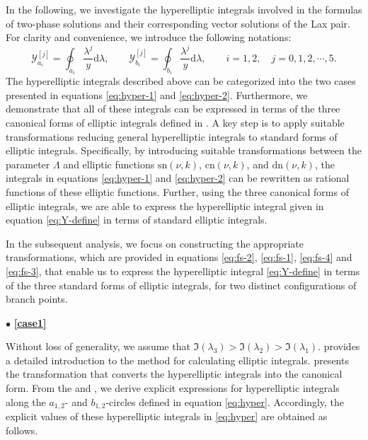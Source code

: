 \documentclass[11pt,reqno]{amsart}
\newcommand{\sn}{\mathrm{sn}}
\newcommand{\cn}{\mathrm{cn}}
\newcommand{\dn}{\mathrm{dn}}
\newcommand{\dd}{\mathrm{d}}
\numberwithin{equation}{section}
\begin{document}
In the following, we investigate the hyperelliptic integrals involved in the formulas of two-phase solutions and their corresponding vector solutions of the Lax pair.
For clarity and convenience, we introduce the following notations:
\begin{equation}\label{eq:Y-define}
	\mathcal{Y}_{a_i}^{[j]}=\oint_{a_i}\frac{\lambda^{j}}{y}\dd \lambda, \qquad \mathcal{Y}_{b_i}^{[j]}=\oint_{b_i}\frac{\lambda^{j}}{y}\dd \lambda, \qquad i=1,2, \quad j=0,1,2,\cdots,5. 
\end{equation}
The hyperelliptic integrals described above can be categorized into the two cases presented in equations \eqref{eq:hyper-1} and \eqref{eq:hyper-2}. 
Furthermore, we demonstrate that all of these integrals can be expressed in terms of the three canonical forms of elliptic integrals defined in . 
A key step is to apply suitable transformations reducing general hyperelliptic integrals to standard forms of elliptic integrals. 
Specifically, by introducing suitable transformations between the parameter $\Lambda$ and elliptic functions 
$\sn(\nu,k)$, $\cn(\nu,k)$, and $\dn(\nu,k)$, the integrals in equations \eqref{eq:hyper-1} and \eqref{eq:hyper-2} can be rewritten as rational functions of these elliptic functions.
Further, using the three canonical forms of elliptic integrals, we are able to express the hyperelliptic integral given in equation \eqref{eq:Y-define} in terms of standard elliptic integrals.

In the subsequent analysis, we focus on constructing the appropriate transformations, which are provided in equations \eqref{eq:fs-2}, \eqref{eq:fs-1}, \eqref{eq:fs-4} and \eqref{eq:fs-3}, that enable us to express the hyperelliptic integral \eqref{eq:Y-define} in terms of the three standard forms of elliptic integrals, for two distinct configurations of branch points.

\vspace{0.1cm}
\noindent $\bullet$\quad
\textbf{\large \ref{case1}}


Without loss of generality, we assume that $\Im(\lambda_3)>\Im(\lambda_2)>\Im(\lambda_1)$.
 provides a detailed introduction to the method for calculating elliptic integrals. 
 presents the transformation that converts the hyperelliptic integrals into the canonical form. 
From the  and , we derive explicit expressions for hyperelliptic integrals along the $a_{1,2}$- and $b_{1,2}$-circles defined in equation \eqref{eq:hyper}.
Accordingly, the explicit values of these hyperelliptic integrals in \eqref{eq:hyper} are obtained as follows.
\end{document}
